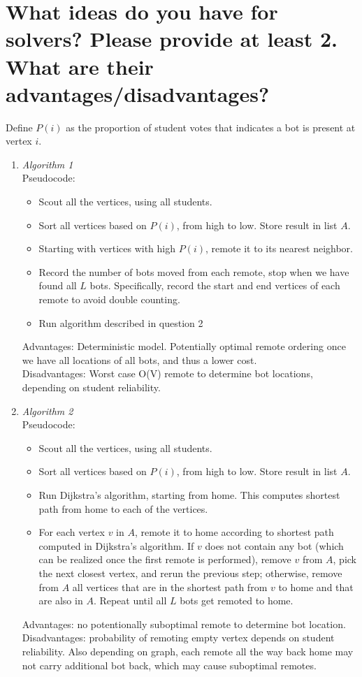 \documentclass[10pt,a4paper]{article}
\begin{document}
\section{What ideas do you have for solvers? Please provide at least 2. What are their advantages/disadvantages?}
Define $P(i)$ as the proportion of student votes that indicates a bot is present at vertex $i$. 
\begin{enumerate}[label=(\alph*)]
\item \emph{Algorithm 1}\\
Pseudocode:
\begin{itemize}
    \item Scout all the vertices, using all students. 
    \item Sort all vertices based on $P(i)$, from high to low. Store result in list $A$. 
    \item Starting with vertices with high $P(i)$, remote it to its nearest neighbor.
    \item Record the number of bots moved from each remote, stop when we have found all $L$ bots. Specifically, record the start and end vertices of each remote to avoid double counting.
    \item Run algorithm described in question 2
\end{itemize}
Advantages: Deterministic model. Potentially optimal remote ordering once we have all locations of all bots, and thus a lower cost.\\
Disadvantages: Worst case O(V) remote to determine bot locations, depending on student reliability.

\item \emph{Algorithm 2}\\
Pseudocode:
\begin{itemize}
    \item Scout all the vertices, using all students. 
    \item Sort all vertices based on $P(i)$, from high to low. Store result in list $A$. 
    \item Run Dijkstra's algorithm, starting from home. This computes shortest path from home to each of the vertices.
    \iffalse
    \item alternatively, only sort $A$ based on the following metric, from low to high: $(1 - P(i)) * path length from vertex to home$.
    \fi
    \item For each vertex $v$ in $A$, remote it to home according to shortest path computed in Dijkstra's algorithm. If $v$ does not contain any bot 
    (which can be realized once the first remote is performed), remove $v$ from $A$, pick the next closest vertex, and rerun the previous step; otherwise, remove from $A$ all vertices that are in 
    the shortest path from $v$ to home and that are also in $A$. Repeat until all $L$ bots get remoted to home.
\end{itemize}
Advantages: no potentionally suboptimal remote to determine bot location.\\
Disadvantages: probability of remoting empty vertex depends on student reliability. Also depending on graph, each remote all the way back home may not carry additional bot back, which may cause suboptimal remotes.
\end{enumerate}
\end{document}
